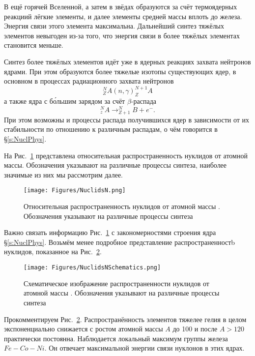 \documentclass[a5paper,openany]{book}
\begin{document}
В ещё горячей Вселенной, а затем в звёдах образуются за счёт термоядерных реакциий лёгкие элементы, и далее элементы средней массы вплоть до железа. Энергия связи этого элемента максимальна. Дальнейший синтез тяжёлых элементов невыгоден из-за того, что энергия связи в более тяжёлых элементах становится меньше.

Синтез более тяжёлых элементов идёт уже в ядерных реакциях захвата нейтронов ядрами. При этом образуются более тяжелые изотопы существующих ядер, в основном в процессах радиационного захвата нейтронов 
\begin{equation}\label{neutroncapture}
	^N_ZA(n, \gamma)^{N+1}_ZA
\end{equation}
а также ядра с б\'{о}льшим зарядом за счёт $\beta$-распада  
\begin{equation}\label{betadecay}
	^N_zA \longrightarrow ^N_{Z+1}B+e^{-}.
\end{equation}
При этом возможны и процессы распада получившихся ядер в зависимости от их стабильности по отношению к различным распадам, о чём говорится в \S\ref{s:NuclPhys}.

На Рис.~\ref{f:NuclidsN} представлена относительная распространенность нуклидов от атомной массы.
Обозначения указывают на различные процессы синтеза, наиболее значимые из них мы рассмотрим далее.
\begin{figure}[ht] 
	\centering\small
	\unitlength=1mm
	\texttt{[image: Figures/NuclidsN.png]} 
	\caption{Относительная распространенность нуклидов от атомной массы \cite{ElementsOrigin}.
	Обозначения указывают на различные процессы синтеза } 
	\label{f:NuclidsN}
\end{figure}

Важно связать информацию Рис.~\ref{f:NuclidsN} с закономерностями строения ядра \S\ref{s:NuclPhys}. Возьмём менее подробное представление распространенностb  нуклидов, показанное на Рис.~\ref{f:NuclidsNSchematics}.
\begin{figure}[ht] 
	\centering\small
	\unitlength=1mm
	\texttt{[image: Figures/NuclidsNSchematics.png]} 
	\caption{Схематическое изображение распространенности нуклидов от атомной массы \cite{ElementsOrigin}.
		Обозначения указывают на различные процессы синтеза } 
	\label{f:NuclidsNSchematics}
\end{figure}

Прокомментируем Рис.~\ref{f:NuclidsNSchematics}. Распространённость элементов тяжелее гелия в целом экспоненциально снижается с ростом атомной массы $A$ до 100 и после $A >120$ практически постоянна. Наблюдается локальный максимум группы железа $Fe-Co-Ni$. 
Он отвечает максимальной энергии связи нуклонов в этих ядрах. 
\end{document}
